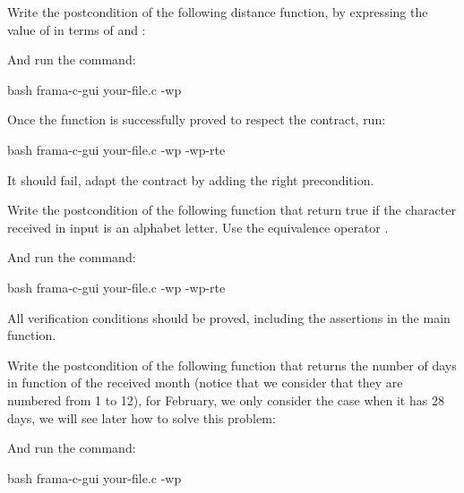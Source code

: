 

Write the postcondition of the following distance function, by expressing
the value of  in terms of  and
:




And run the command:


\begin{CodeBlock}{bash}
frama-c-gui your-file.c -wp
\end{CodeBlock}


Once the function is successfully proved to respect the contract, run:


\begin{CodeBlock}{bash}
frama-c-gui your-file.c -wp -wp-rte
\end{CodeBlock}


It should fail, adapt the contract by adding the right precondition.






Write the postcondition of the following function that return true if
the character received in input is an alphabet letter. Use the equivalence
operator \CodeInline{<==>}.





And run the command:


\begin{CodeBlock}{bash}
frama-c-gui your-file.c -wp -wp-rte
\end{CodeBlock}


All verification conditions should be proved, including the assertions in the
main function.






Write the postcondition of the following function that returns the number
of days in function of the received month (notice that we consider that
they are numbered from 1 to 12), for February, we only consider the case
when it has 28 days, we will see later how to solve this problem:





And run the command:


\begin{CodeBlock}{bash}
frama-c-gui your-file.c -wp
\end{CodeBlock}


